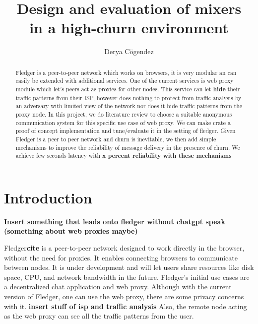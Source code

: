 \documentclass[a4paper,11pt,oneside]{report}
\title{Design and evaluation of mixers\\in a high-churn environment}
\author{Derya Cögendez}
\begin{document}
\maketitle
\makeacks

\begin{abstract}
Fledger is a peer-to-peer network which works on browsers, it is very modular an can easily be extended with additional services. One of the current services is web proxy module which let's peers act as proxies for other nodes. This service can let \textbf{hide} their traffic patterns from their ISP, however does nothing to protect from traffic analysis by an adversary with limited view of the network nor does it hide traffic patterns from the proxy node. In this project, we do literature review to choose a suitable anonymous communication system for this specific use case of web proxy. We can make crate a proof of concept implementation and tune/evaluate it in the setting of fledger. Given Fledger is a peer to peer network and churn is inevitable, we then add simple mechanisms to improve the reliability of message delivery in the presence of churn. We achieve few seconds latency with \textbf{x percent reliability with these mechanisms}
\end{abstract}

\maketoc

\chapter{Introduction}

\textbf{Insert something that leads onto fledger without chatgpt speak (something about web proxies maybe)}

Fledger\textbf{cite} is a peer-to-peer network designed to work directly in the browser, without the need for proxies. It enables connecting browsers to communicate between nodes. It is under development and will let users share resources like disk space, CPU, and network bandwidth in the future. Fledger's initial use cases are a decentralized chat application and web proxy. Although with the current version of Fledger, one can use the web proxy, there are some privacy concerns with it. \textbf{insert stuff of isp and traffic analysis} Also, the remote node acting as the web proxy can see all the traffic patterns from the user. 
\end{document}
